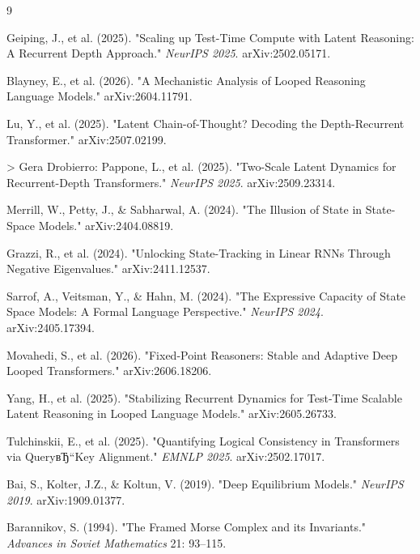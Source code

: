\begin{thebibliography}{9}

Geiping, J., et al. (2025). "Scaling up Test-Time Compute with Latent Reasoning: A Recurrent Depth Approach." \textit{NeurIPS 2025}. arXiv:2502.05171.

Blayney, E., et al. (2026). "A Mechanistic Analysis of Looped Reasoning Language Models." arXiv:2604.11791.

Lu, Y., et al. (2025). "Latent Chain-of-Thought? Decoding the Depth-Recurrent Transformer." arXiv:2507.02199.

> Gera Drobierro:
Pappone, L., et al. (2025). "Two-Scale Latent Dynamics for Recurrent-Depth Transformers." \textit{NeurIPS 2025}. arXiv:2509.23314.

Merrill, W., Petty, J., \& Sabharwal, A. (2024). "The Illusion of State in State-Space Models." arXiv:2404.08819.

Grazzi, R., et al. (2024). "Unlocking State-Tracking in Linear RNNs Through Negative Eigenvalues." arXiv:2411.12537.

Sarrof, A., Veitsman, Y., \& Hahn, M. (2024). "The Expressive Capacity of State Space Models: A Formal Language Perspective." \textit{NeurIPS 2024}. arXiv:2405.17394.

Movahedi, S., et al. (2026). "Fixed-Point Reasoners: Stable and Adaptive Deep Looped Transformers." arXiv:2606.18206.

Yang, H., et al. (2025). "Stabilizing Recurrent Dynamics for Test-Time Scalable Latent Reasoning in Looped Language Models." arXiv:2605.26733.

Tulchinskii, E., et al. (2025). "Quantifying Logical Consistency in Transformers via QueryвЂ“Key Alignment." \textit{EMNLP 2025}. arXiv:2502.17017.

Bai, S., Kolter, J.Z., \& Koltun, V. (2019). "Deep Equilibrium Models." \textit{NeurIPS 2019}. arXiv:1909.01377.

Barannikov, S. (1994). "The Framed Morse Complex and its Invariants." \textit{Advances in Soviet Mathematics} 21: 93--115.

\end{thebibliography}

